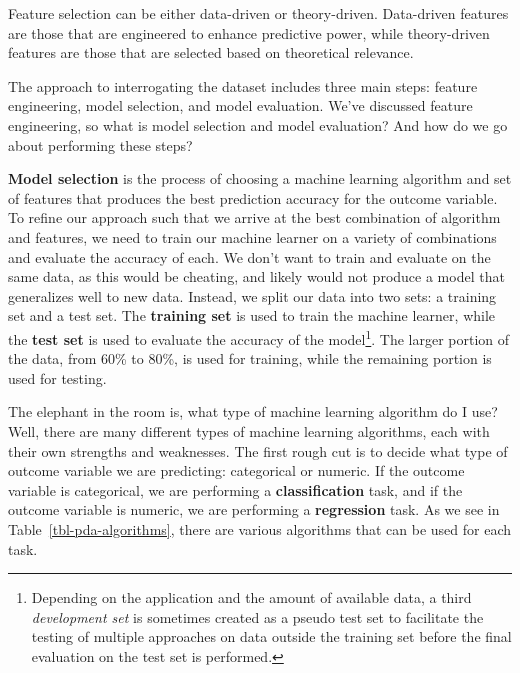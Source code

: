 \documentclass[
  letterpaper,
]{latex/krantz}
\theoremstyle{definition}
\theoremstyle{remark}
\begin{document}
Feature selection can be either data-driven or theory-driven.
Data-driven features are those that are engineered to enhance predictive
power, while theory-driven features are those that are selected based on
theoretical relevance.

The approach to interrogating the dataset includes three main steps:
feature engineering, model selection, and model evaluation. We've
discussed feature engineering, so what is model selection and model
evaluation? And how do we go about performing these steps?

\textbf{Model selection} is the process of choosing a machine learning
algorithm and set of features that produces the best prediction accuracy
for the outcome variable. To refine our approach such that we arrive at
the best combination of algorithm and features, we need to train our
machine learner on a variety of combinations and evaluate the accuracy
of each. We don't want to train and evaluate on the same data, as this
would be cheating, and likely would not produce a model that generalizes
well to new data. Instead, we split our data into two sets: a training
set and a test set. The \textbf{training set} is used to train the
machine learner, while the \textbf{test set} is used to evaluate the
accuracy of the model\footnote{Depending on the application and the
  amount of available data, a third \emph{development set} is sometimes
  created as a pseudo test set to facilitate the testing of multiple
  approaches on data outside the training set before the final
  evaluation on the test set is performed.}. The larger portion of the
data, from 60\% to 80\%, is used for training, while the remaining
portion is used for testing.

The elephant in the room is, what type of machine learning algorithm do
I use? Well, there are many different types of machine learning
algorithms, each with their own strengths and weaknesses. The first
rough cut is to decide what type of outcome variable we are predicting:
categorical or numeric. If the outcome variable is categorical, we are
performing a \textbf{classification} task, and if the outcome variable
is numeric, we are performing a \textbf{regression} task. As we see in
Table~\ref{tbl-pda-algorithms}, there are various algorithms that can be
used for each task.
\end{document}
